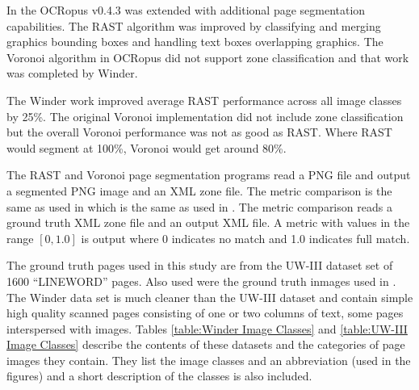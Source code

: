 \documentclass[conference]{IEEEtran}
\begin{document}


In \cite{winder2010extending} the OCRopus v0.4.3 was extended with
additional page segmentation capabilities. The RAST algorithm was improved by
classifying and merging graphics bounding boxes and handling text boxes
overlapping graphics.  The Voronoi algorithm in OCRopus did not support zone
classification and that work was completed by Winder.

The Winder work improved average RAST performance across all image classes by
25\%. The original Voronoi implementation did not include zone classification
but the overall Voronoi performance was not as good as RAST. Where RAST would
segment at 100\%, Voronoi would get around 80\%.


The RAST and Voronoi page segmentation programs read a PNG file and output a
segmented PNG image and an XML zone file. The metric comparison is the same as
used in \cite{winder2010extending} which is the same as used in
\cite{phillips1999empirical}\cite{antonacopoulos2007page}. The metric comparison
reads a ground truth XML zone file and an output XML file. A metric with values
in the range $[0, 1.0]$ is output where 0 indicates no match and 1.0 indicates
full match. 

The ground truth pages used in this study are from the UW-III dataset set of
1600 “LINEWORD” pages. Also used were the ground truth inmages used in \cite{winder2010extending}.
The Winder data set is much cleaner than the UW-III dataset
and contain simple high quality scanned pages consisting of one or two
columns of text, some pages interspersed with images. Tables \ref{table:Winder Image Classes} 
and \ref{table:UW-III Image Classes} describe the contents of these datasets
and the categories of page images they contain.  They list the image classes 
and an abbreviation (used in the figures) and a short description of the
classes is also included.
\end{document}
